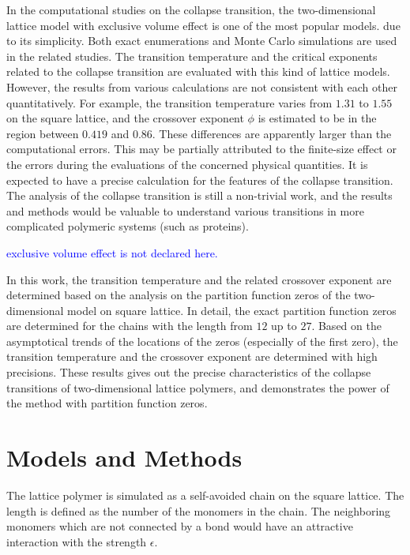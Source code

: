 \documentclass[preprint,preprintnumbers,amsmath,amssymb,showpacs,pre]{revtex4-1}
\begin{document}
In the computational studies on the collapse transition, the two-dimensional
lattice model with exclusive volume effect is one of the most popular models.
due to its simplicity. Both exact enumerations and Monte Carlo simulations
are used in the related studies. The transition temperature and the
critical exponents related to the collapse transition are evaluated with
this kind of lattice models. However, the results from various calculations
are not consistent with each other quantitatively. For example, the transition
temperature varies from $1.31$ to $1.55$ on the square lattice, and the
crossover exponent $\phi$ is estimated to be in the region between $0.419$
and $0.86$. These differences are apparently larger than the computational
errors.
This may be partially attributed to the finite-size effect or the errors
during the evaluations of the concerned physical quantities. It is expected
to have a precise calculation for the features of the collapse transition.
The analysis of the collapse transition is still a non-trivial work, and
the results and methods would be valuable to understand various transitions
in more complicated polymeric systems (such as proteins).

\textcolor{blue}{exclusive volume effect is not declared here.}

In this work, the transition temperature and the related crossover exponent
are determined based on the analysis on the partition function zeros of
the two-dimensional model on square lattice. In detail, the exact
partition function zeros are determined for the chains with the length
from $12$ up to $27$. Based on the asymptotical trends of the locations of 
the zeros (especially of the first zero), the transition temperature
and the crossover exponent are determined with high precisions. These
results gives out the precise characteristics of the collapse transitions
of two-dimensional lattice polymers, and demonstrates the power of the
method with partition function zeros.

\section{Models and Methods}

The lattice polymer is simulated as a self-avoided chain on the square
lattice. The length is defined as the number of the monomers in the chain.
The neighboring monomers which are not connected by a bond
would have an attractive interaction with the strength $\epsilon$.
\end{document}

